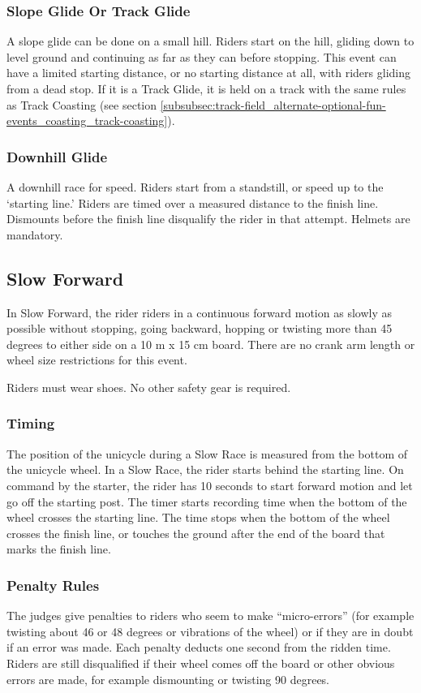 \subsubsection{Slope Glide Or Track Glide}
A slope glide can be done on a small hill.
Riders start on the hill, gliding down to level ground and continuing as far as they can before stopping.
This event can have a limited starting distance, or no starting distance at all, with riders gliding from a dead stop.
If it is a Track Glide, it is held on a track with the same rules as Track Coasting (see section \ref{subsubsec:track-field_alternate-optional-fun-events_coasting_track-coasting}).

\subsubsection{Downhill Glide}
A downhill race for speed.
Riders start from a standstill, or speed up to the `starting line.'
Riders are timed over a measured distance to the finish line.
Dismounts before the finish line disqualify the rider in that attempt.
Helmets are mandatory.

\subsection{Slow Forward}
In Slow Forward, the rider riders in a continuous forward motion as slowly as possible without stopping, going backward, hopping or twisting more than 45 degrees to either side on a 10 m x 15 cm board. There are no crank arm length or wheel size restrictions for this event. 

Riders must wear shoes. No other safety gear is required.

\subsubsection{Timing}
The position of the unicycle during a Slow Race is measured from the bottom of the unicycle wheel.
In a Slow Race, the rider starts behind the starting line. On command by the starter, the rider has 10 seconds to start forward motion and let go off the starting post.
The timer starts recording time when the bottom of the wheel crosses the starting line.
The time stops when the bottom of the wheel crosses the finish line, or touches the ground after the end of the board that marks the finish line. 


\subsubsection{Penalty Rules}
The judges give penalties to riders who seem to make ``micro-errors'' (for example twisting about 46 or 48 degrees or vibrations of the wheel) or if they are in doubt if an error was made. Each penalty deducts one second from the ridden time.
Riders are still disqualified if their wheel comes off the board or other obvious errors are made, for example dismounting or twisting 90 degrees.

